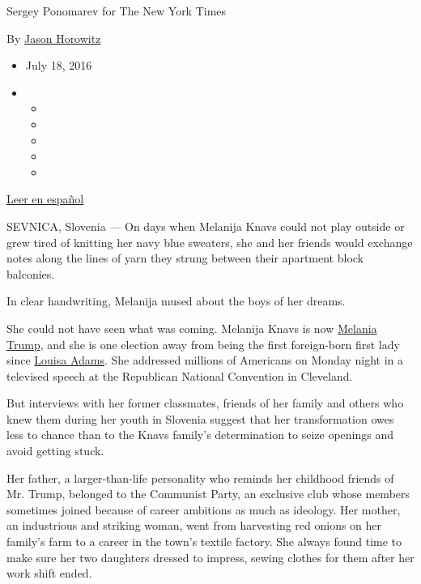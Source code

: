 Sergey Ponomarev for The New York Times

By \href{https://www.nytimes.com/by/jason-horowitz}{Jason Horowitz}

\begin{itemize}
\item
  July 18, 2016
\item
  \begin{itemize}
  \item
  \item
  \item
  \item
  \item
  \end{itemize}
\end{itemize}

\href{https://www.nytimes.com/es/2016/07/19/melania-trump-de-un-pueblo-en-eslovenia-a-las-puertas-de-la-casa-blanca/}{Leer
en español}

SEVNICA, Slovenia --- On days when Melanija Knavs could not play outside
or grew tired of knitting her navy blue sweaters, she and her friends
would exchange notes along the lines of yarn they strung between their
apartment block balconies.

In clear handwriting, Melanija mused about the boys of her dreams.

She could not have seen what was coming. Melanija Knavs is now
\href{http://www.nytimes.com/2016/07/20/us/politics/melania-trump-speech.html}{Melania
Trump}, and she is one election away from being the first foreign-born
first lady since
\href{https://www.whitehouse.gov/1600/first-ladies/louisaadams}{Louisa
Adams}. She addressed millions of Americans on Monday night in a
televised speech at the Republican National Convention in Cleveland.

But interviews with her former classmates, friends of her family and
others who knew them during her youth in Slovenia suggest that her
transformation owes less to chance than to the Knavs family's
determination to seize openings and avoid getting stuck.

Her father, a larger-than-life personality who reminds her childhood
friends of Mr. Trump, belonged to the Communist Party, an exclusive club
whose members sometimes joined because of career ambitions as much as
ideology. Her mother, an industrious and striking woman, went from
harvesting red onions on her family's farm to a career in the town's
textile factory. She always found time to make sure her two daughters
dressed to impress, sewing clothes for them after her work shift ended.

